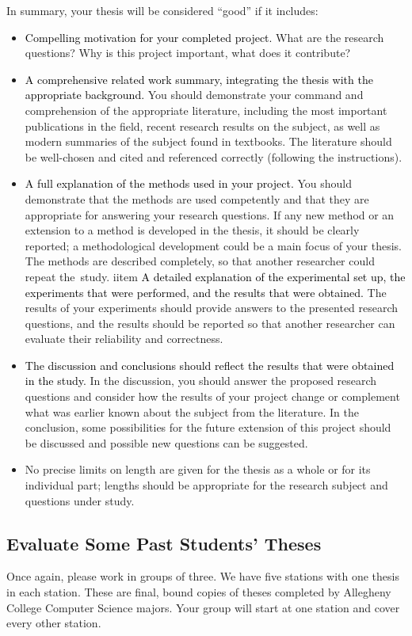In summary, your thesis will be considered ``good'' if it includes:
\begin{itemize}
\item
\textcolor{black}{Compelling motivation for your completed project.} What are the research questions? Why is this project important, what does it contribute?
\item
\textcolor{black}{A comprehensive related work summary, integrating the thesis with the appropriate background.}
You should demonstrate your command and comprehension of the appropriate literature, including the most important publications in the field, recent research results on the subject, as well as modern summaries of the subject found in textbooks. The literature should be well-chosen and cited and referenced correctly (following the instructions).
\item
\textcolor{black}{A full explanation of the methods used in your project.}
You should demonstrate that the methods are used competently and that they are appropriate for answering your 
research questions. If any new method or an extension to a method is developed in the thesis, it should be clearly
reported; a methodological development could be a main focus of your thesis. The methods are described completely, so
that another researcher could repeat \mbox{the study}.
iitem
\textcolor{black}{A detailed explanation of the experimental set up, the experiments that were performed, and the results that were obtained.}
The results of your experiments should provide answers to the presented research questions, and the results should be
reported so that another researcher can evaluate their reliability and correctness.
\item
\textcolor{black}{The discussion and conclusions should reflect the results that were obtained in the study.} In the discussion, you should answer the proposed research questions and consider how the results of your project change or complement what was earlier known about the subject from the literature. In the conclusion, some possibilities for the future extension of this project should be discussed and possible new questions can be suggested.
\item
No precise limits on length are given for the thesis as a whole or for its individual part; lengths should be appropriate for the research subject and questions under study.
\end{itemize}

\subsection*{Evaluate Some Past Students' Theses}
Once again, please work in groups of three. We have five stations with one thesis in each station.
These are final, bound copies of theses completed by Allegheny College Computer
Science majors. Your group will start at one station and cover every other station.

